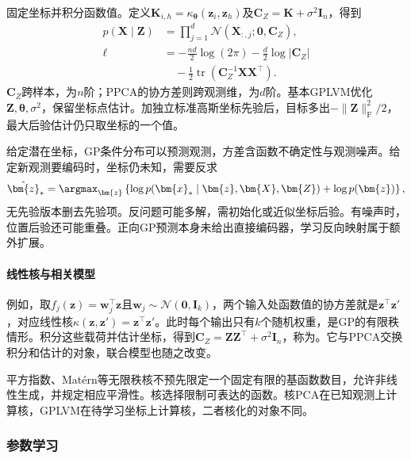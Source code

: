 固定坐标并积分函数值。定义$\bm{K}_{i,h}=\kappa_{\bm{\theta}}(\bm{z}_i,\bm{z}_h)$及$\bm{C}_Z=\bm{K}+\sigma^2\bm{I}_n$，得到
\begin{equation}
\label{eq:dim-gplvm-likelihood}
\begin{aligned}
p(\bm{X}\mid\bm{Z})
&=\prod_{j=1}^d
\mathcal{N}(\bm{X}_{:,j};\bm{0},\bm{C}_Z),\\
\ell&=-\frac{nd}{2}\log(2\pi)
-\frac{d}{2}\log|\bm{C}_Z|\\
&\quad-\frac{1}{2}
\operatorname{tr}(\bm{C}_Z^{-1}\bm{X}\bm{X}^\top).
\end{aligned}
\end{equation}
$\bm{C}_Z$跨样本，为$n$阶；PPCA的协方差则跨观测维，为$d$阶。基本GPLVM优化$\bm{Z},\bm{\theta},\sigma^2$，保留坐标点估计。加独立标准高斯坐标先验后，目标多出$-\lVert\bm{Z}\rVert_{\mathrm{F}}^2/2$，最大后验估计仍只取坐标的一个值。

给定潜在坐标，GP条件分布可以预测观测，方差含函数不确定性与观测噪声。给定新观测要编码时，坐标仍未知，需要反求
\begin{equation}
\label{eq:dim-gplvm-encoding}
\hat{\bm{z}}_*=\argmax_{\bm{z}}
\left\{\log p(\bm{x}_*\mid\bm{z},\bm{X},\bm{Z})
+\log p(\bm{z})\right\},
\end{equation}
无先验版本删去先验项。反问题可能多解，需初始化或近似坐标后验。有噪声时，位置后验还可能重叠。正向GP预测本身未给出直接编码器，学习反向映射属于额外扩展。

\paragraph{线性核与相关模型}

例如，取$f_j(\bm z)=\bm w_j^\top\bm z$且$\bm w_j\sim\mathcal N(\bm0,\bm I_k)$，两个输入处函数值的协方差就是$\bm z^\top\bm z'$，对应线性核$\kappa(\bm{z},\bm{z}')=\bm{z}^\top\bm{z}'$。此时每个输出只有$k$个随机权重，是GP的有限秩情形。积分这些载荷并估计坐标，得到$\bm{C}_Z=\bm{Z}\bm{Z}^\top+\sigma^2\bm{I}_n$，称为。它与PPCA交换积分和估计的对象，联合模型也随之改变。

平方指数、Matérn等无限秩核不预先限定一个固定有限的基函数数目，允许非线性生成，并规定相应平滑性。核选择限制可表达的函数。核PCA在已知观测上计算核，GPLVM在待学习坐标上计算核，二者核化的对象不同。

\subsubsection{参数学习}
\label{sec:dim-gplvm-learning}

